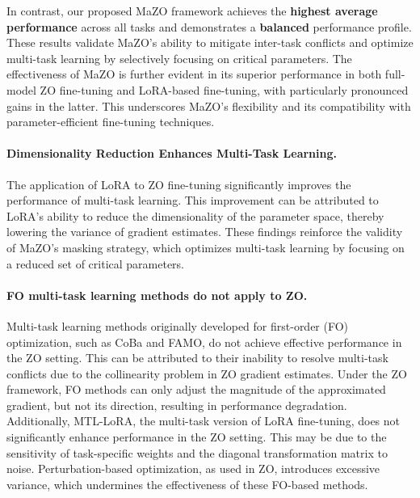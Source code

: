 In contrast, our proposed MaZO framework achieves the {\bf highest average performance} across all tasks and demonstrates a {\bf balanced} performance profile. These results validate MaZO's ability to mitigate inter-task conflicts and optimize multi-task learning by selectively focusing on critical parameters. The effectiveness of MaZO is further evident in its superior performance in both full-model ZO fine-tuning and LoRA-based fine-tuning, with particularly pronounced gains in the latter. This underscores MaZO's flexibility and its compatibility with parameter-efficient fine-tuning techniques.

\paragraph{Dimensionality Reduction Enhances Multi-Task Learning.} 
The application of LoRA to ZO fine-tuning significantly improves the performance of multi-task learning. This improvement can be attributed to LoRA's ability to reduce the dimensionality of the parameter space, thereby lowering the variance of gradient estimates. These findings reinforce the validity of MaZO's masking strategy, which optimizes multi-task learning by focusing on a reduced set of critical parameters.

\paragraph{FO multi-task learning methods do not apply to ZO.} Multi-task learning methods originally developed for first-order (FO) optimization, such as CoBa and FAMO, do not achieve effective performance in the ZO setting. This can be attributed to their inability to resolve multi-task conflicts due to the collinearity problem in ZO gradient estimates. Under the ZO framework, FO methods can only adjust the magnitude of the approximated gradient, but not its direction, resulting in  performance degradation. 
Additionally, MTL-LoRA, the multi-task version of LoRA fine-tuning, does not significantly enhance performance in the ZO setting. This may be due to the sensitivity of task-specific weights and the diagonal transformation matrix to noise. Perturbation-based optimization, as used in ZO, introduces excessive variance, which undermines the effectiveness of these FO-based methods.


